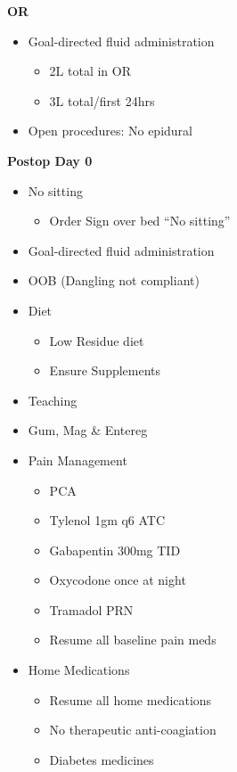 \documentclass[
  letterpaper,
]{scrbook}
\providecommand{\tightlist}{%
  \setlength{\itemsep}{0pt}\setlength{\parskip}{0pt}}
\begin{document}
\textbf{OR}

\begin{itemize}
\tightlist
\item
  Goal-directed fluid administration

  \begin{itemize}
  \tightlist
  \item
    2L total in OR
  \item
    3L total/first 24hrs
  \end{itemize}
\item
  Open procedures: No epidural
\end{itemize}

\textbf{Postop Day 0}

\begin{itemize}
\tightlist
\item
  No sitting

  \begin{itemize}
  \tightlist
  \item
    Order Sign over bed ``No sitting''
  \end{itemize}
\item
  Goal-directed fluid administration
\item
  OOB (Dangling not compliant)
\item
  Diet

  \begin{itemize}
  \tightlist
  \item
    Low Residue diet
  \item
    Ensure Supplements
  \end{itemize}
\item
  Teaching
\item
  Gum, Mag \& Entereg
\item
  Pain Management

  \begin{itemize}
  \tightlist
  \item
    PCA
  \item
    Tylenol 1gm q6 ATC
  \item
    Gabapentin 300mg TID
  \item
    Oxycodone once at night
  \item
    Tramadol PRN
  \item
    Resume all baseline pain meds
  \end{itemize}
\item
  Home Medications

  \begin{itemize}
  \tightlist
  \item
    Resume all home medications
  \item
    No therapeutic anti-coagiation
  \item
    Diabetes medicines


\end{itemize}
\end{itemize}
\end{document}
